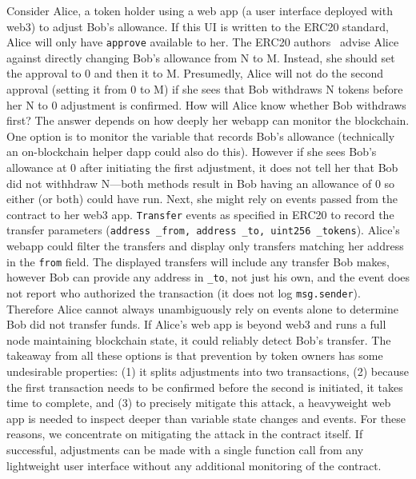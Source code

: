 Consider Alice, a token holder using a web app (\eg a user interface deployed with web3) to adjust Bob's allowance. If this UI is written to the ERC20 standard, Alice will only have \texttt{approve} available to her. The ERC20 authors~\cite{Ref08} advise Alice against directly changing Bob's allowance from N to M. Instead, she should set the approval to 0 and then it to M. Presumedly, Alice will not do the second approval (setting it from 0 to M) if she sees that Bob withdraws N tokens before her N to 0 adjustment is confirmed. How will Alice know whether Bob withdraws first? The answer depends on how deeply her webapp can monitor the blockchain. One option is to monitor the variable that records Bob's allowance (technically an on-blockchain helper dapp could also do this). However if she sees Bob's allowance at 0 after initiating the first adjustment, it does not tell her that Bob did not withhdraw N---both methods result in Bob having an allowance of 0 so either (or both) could have run. Next, she might rely on events passed from the contract to her web3 app. \texttt{Transfer} events as specified in ERC20 to record the transfer parameters (\ie  \texttt{address \_from, address \_to, uint256 \_tokens}). Alice's webapp could filter the transfers and display only transfers matching her address in the \texttt{from} field. The displayed transfers will include any transfer Bob makes, however Bob can provide any address in \texttt{\_to}, not just his own, and the event does not report who authorized the transaction (\ie it does not log \texttt{msg.sender}). Therefore Alice cannot always unambiguously rely on events alone to determine Bob did not transfer funds. If Alice's web app is beyond web3 and runs a full node maintaining blockchain state, it could reliably detect Bob's transfer. The takeaway from all these options is that prevention by token owners has some undesirable properties: (1) it splits adjustments into two transactions, (2) because the first transaction needs to be confirmed before the second is initiated, it takes time to complete, and (3) to precisely mitigate this attack, a heavyweight web app is needed to inspect deeper than variable state changes and events. For these reasons, we concentrate on mitigating the attack in the contract itself. If successful, adjustments can be made with a single function call from any lightweight user interface without any additional monitoring of the contract. 

   
	
